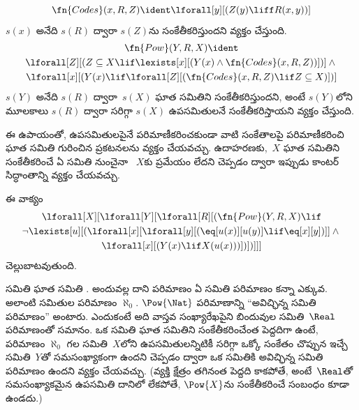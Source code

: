\documentclass[../../../include/open-logic-section]{subfiles}
\begin{document}
\begin{prop}
  \[
  \fn{Codes}(x, R, Z) \ident \lforall[y][(Z(y) \liff
    R(x, y))]
  \]
$s(x)$ అనేది $s(R)$ ద్వారా $s(Z)$ను సంకేతీకరిస్తుందని వ్యక్తం
చేస్తుంది. 
\begin{multline*}
  \fn{Pow}(Y, R, X) \ident \\
  \lforall[Z][(Z \subseteq X \lif \lexists[x][(Y(x) \land
    \fn{Codes}(x, R, Z))])] \land {} \\ \lforall[x][(Y(x) \lif
  \lforall[Z][(\fn{Codes}(x, R, Z) \lif Z \subseteq X)])]
\end{multline*}
$s(Y)$ అనేది $s(R)$ ద్వారా~$s(X)$ ఘాత సమితిని సంకేతీకరిస్తుందని,
అంటే $s(Y)$లోని మూలకాలు $s(R)$ ద్వారా సరిగ్గా $s(X)$ ఉపసమితులనే
సంకేతీకరిస్తాయని వ్యక్తం చేస్తుంది.
\end{prop}

\begin{explain}
ఈ ఉపాయంతో, ఉపసమితులపైనే పరిమాణీకరించకుండా వాటి సంకేతాలపై
పరిమాణీకరించి ఘాత సమితి గురించిన ప్రకటనలను వ్యక్తం చేయవచ్చు.
ఉదాహరణకు,~$X$ ఘాత సమితిని సంకేతీకరించే ఏ సమితి నుంచైనా
~$X$కు  ప్రమేయం లేదని చెప్పడం ద్వారా
ఇప్పుడు కాంటర్ సిద్ధాంతాన్ని వ్యక్తం చేయవచ్చు.
\end{explain}

\begin{prop}
ఈ వాక్యం
\begin{multline*}
  \lforall[X][\lforall[Y][\lforall[R][(\fn{Pow}(Y, R, X) \lif \\
      \lnot \lexists[u][(\lforall[x][\lforall[y][(\eq[u(x)][u(y)] \lif
            \eq[x][y])]] \land {}\\
        \lforall[x][(Y(x) \lif X(u(x)))])])]]]
\end{multline*}
చెల్లుబాటవుతుంది.
\end{prop}

\begin{explain}
 సమితి ఘాత సమితి
. అందువల్ల దాని పరిమాణం
 ఏ సమితి పరిమాణం కన్నా ఎక్కువ.
అలాంటి సమితుల పరిమాణం $\aleph_0$. $\Pow{\Nat}$ పరిమాణాన్ని “అవిచ్ఛిన్న
సమితి పరిమాణం” అంటారు. ఎందుకంటే అది వాస్తవ సంఖ్యారేఖపైని బిందువుల
సమితి~$\Real$ పరిమాణంతో సమానం. ఒక
 సమితి ఘాత సమితిని
సంకేతీకరించేంత పెద్దదిగా  ఉంటే, పరిమాణం
$\aleph_0$ గల సమితి~$X$లోని ఉపసమితులన్నిటికీ సరిగ్గా ఒక్కో సంకేతం
చొప్పున ఇచ్చే సమితి~$Y$తో సమసంఖ్యాకంగా ఉందని చెప్పడం ద్వారా ఒక
సమితికి అవిచ్ఛిన్న సమితి పరిమాణం ఉందని వ్యక్తం చేయవచ్చు. (వ్యక్తి క్షేత్రం తగినంత పెద్దది కాకపోతే,
అంటే~$\Real$తో సమసంఖ్యాకమైన ఉపసమితి దానిలో లేకపోతే,
$\Pow{X}$ను సంకేతీకరించే సంబంధం కూడా ఉండదు.)
\end{explain}
\end{document}
